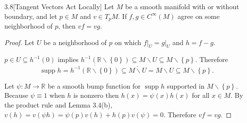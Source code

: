 \begin{prop}{3.8}[Tangent Vectors Act Locally]
    Let \( M \) be a smooth manifold with or without boundary, and let \( p \in M \) and \( v \in T_{p}M \). If \( f, g \in C^{\infty}(M) \) agree on some neighborhood of \( p \), then \( vf = vg \).
\end{prop}

\begin{proof}
    Let \( U \) be a neighborhood of \( p \) on which \( f\vert_{U} = g\vert_{U} \) and \( h = f - g \).

    \( p \in U \subseteq h^{-1}(0) \) implies \( h^{-1}(\mathbb{R} \smallsetminus \left\{0\right\}) \subseteq M \smallsetminus U \subseteq M \smallsetminus \left\{ p \right\} \). Therefore
    \[
        \operatorname{supp} h = \overline{h^{-1}(\mathbb{R} \smallsetminus \left\{0\right\})} \subseteq \overline{M \smallsetminus U} = M \smallsetminus U \subseteq M \smallsetminus \left\{ p \right\}.
    \]

    Let \( \psi: M \to \mathbb{R} \) be a smooth bump function for \( \operatorname{supp} h \) supported in \( M \smallsetminus \left\{p\right\} \). Because \( \psi \equiv 1 \) when \( h \) is nonzero then \( h(x) = \psi(x) h(x) \) for all \( x \in M \). By the product rule and Lemma 3.4(b), \( v(h) = v(\psi h) = \psi(p) v(h) + h(p) v(\psi) = 0 \). Therefore \( vf = vg \).
\end{proof}






